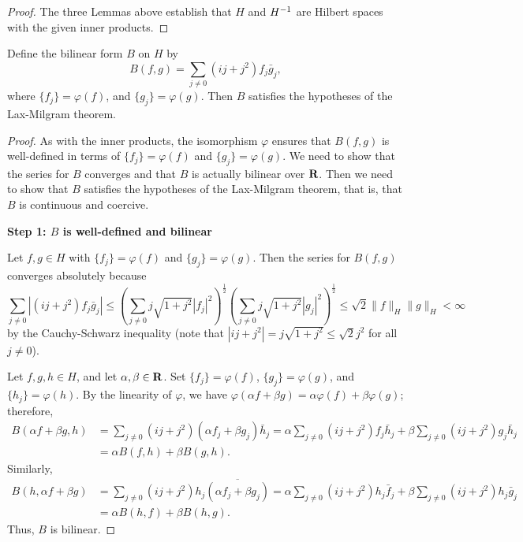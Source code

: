 \documentclass{homework}
\begin{document}
\begin{arabicparts}
\begin{proof}
		The three Lemmas above establish that $H$ and ${H^{-1}}$ are Hilbert spaces with the given inner products.
		\end{proof}
		
		\questionpart
		Define the bilinear form $B$ on $H$ by
		\begin{equation}
			B(f,g) = \sum_{j\ne0}(ij + j^2)f_j\bar{g}_j,
		\end{equation}
		where $\{f_j\} = \varphi(f)$, and $\{g_j\} = \varphi(g)$.
		Then $B$ satisfies the hypotheses of the Lax-Milgram theorem.
		
		\begin{proof}
			As with the inner products, the isomorphism $\varphi$ ensures that $B(f,g)$ is well-defined in terms of $\{f_j\} = \varphi(f)$ and $\{g_j\} = \varphi(g)$. We need to show that the series for $B$ converges and that $B$ is actually bilinear over $\textnormal{\bf R}$. Then we need to show that $B$ satisfies the hypotheses of the Lax-Milgram theorem, that is, that $B$ is continuous and coercive.
			
			\textbf{Step 1: $B$ is well-defined and bilinear}
			
			Let $f, g\in H$ with $\{f_j\} = \varphi(f)$ and $\{g_j\} = \varphi(g)$. Then the series for $B(f,g)$ converges absolutely because
			\begin{equation}
				\label{eq:B_bounded}
				\sum_{j\ne0}|(ij+j^2)f_j\bar{g}_j| \le \left(\sum_{j\ne0}j\sqrt{1+j^2}|f_j|^2\right)^\frac{1}{2}\left(\sum_{j\ne0}j\sqrt{1+j^2}|g_j|^2\right)^\frac{1}{2} \le \sqrt{2}\lVert f \rVert_H\lVert g\rVert_H < \infty
			\end{equation}
			by the Cauchy-Schwarz inequality (note that $|ij +j^2| = j\sqrt{1+j^2} \le \sqrt{2}j^2$ for all $j\ne 0$).
			
			Let $f,g,h\in H$, and let $\alpha,\beta \in \textnormal{\bf R}$. Set $\{f_j\} = \varphi(f)$, $\{g_j\} = \varphi(g)$, and $\{h_j\} = \varphi(h)$. By the linearity of $\varphi$, we have $\varphi(\alpha f + \beta g) = \alpha \varphi(f)+ \beta\varphi(g)$; therefore,
			\begin{align}
				B(\alpha f + \beta g, h) &= \sum_{j\ne0}(ij + j^2)(\alpha f_j + \beta g_j)\bar{h}_j =\alpha\sum_{j\ne 0}(ij+j^2)f_j\bar{h}_j + \beta\sum_{j\ne0}(ij+j^2)g_j\bar{h}_j \\
				&= \alpha B(f,h) + \beta B(g,h).
			\end{align}
			Similarly,
			\begin{align}
				B(h, \alpha f + \beta g) &= \sum_{j\ne0}(ij + j^2)h_j\overline{(\alpha f_j + \beta g_j)} =\alpha\sum_{j\ne 0}(ij+j^2)h_j\bar{f}_j + \beta\sum_{j\ne0}(ij+j^2)h_j\bar{g}_j \\
				&= \alpha B(h,f) + \beta B(h,g).
			\end{align}
			Thus, $B$ is bilinear.
			

\end{proof}
\end{arabicparts}
\end{document}
